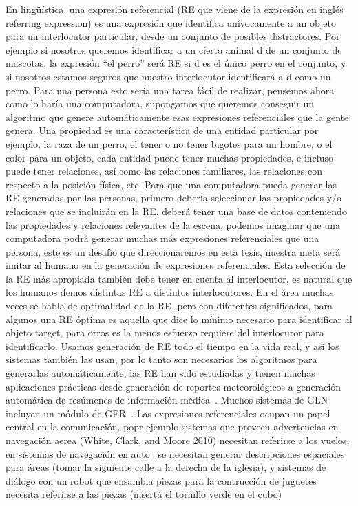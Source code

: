 En ling\"u\'{i}stica, una expresi\'on referencial (RE que viene de la expresi\'on en ingl\'es referring expression) es una expresi\'on que identifica un\'ivocamente a un objeto para un interlocutor particular, desde un conjunto de posibles distractores. Por ejemplo si nosotros queremos identificar a un cierto animal d de un conjunto de mascotas, la expresi\'on ``el perro'' ser\'a RE si d es el \'unico perro en el conjunto, y si nosotros estamos seguros que nuestro interlocutor identificar\'a a d como un perro. Para una persona esto ser\'ia una tarea f\'acil de realizar, pensemos ahora como lo har\'ia una computadora, supongamos que queremos conseguir un algoritmo que genere autom\'aticamente esas expresiones referenciales que la gente genera. Una propiedad es una caracter\'istica de una entidad particular por ejemplo, la raza de un perro, el tener o no tener bigotes para un hombre, o el color para un objeto, cada entidad puede tener muchas propiedades, e incluso puede tener relaciones, as\'i como las relaciones familiares, las relaciones con respecto a la posici\'on f\'isica, etc. Para que una computadora pueda generar las RE generadas por las personas, primero deber\'ia seleccionar las propiedades y/o relaciones que se incluir\'an en la RE, deber\'a tener una base de datos conteniendo las propiedades y relaciones relevantes de la escena, podemos imaginar que una computadora podr\'a generar muchas m\'as expresiones referenciales que una persona, este es un desaf\'io que direccionaremos en esta tesis, nuestra meta ser\'a imitar al humano en la generaci\'on de expresiones referenciales. Esta selecci\'on de la RE m\'as apropiada tambi\'en debe tener en cuenta al interlocutor, es natural que los humanos demos distintas RE a distintos interlocutores. En el \'area muchas veces se habla de optimalidad de la RE, pero con diferentes significados, para algunos una RE \'optima es aquella que dice lo m\'inimo necesario para identificar al objeto target, para otros es la menos esfuerzo requiere del interlocutor para identificarlo.
Usamos generaci\'on de RE todo el tiempo en la vida real, y as\'i los sistemas tambi\'en las usan, por lo tanto son necesarios los algoritmos para generarlas autom\'aticamente, las RE han sido estudiadas y tienen muchas aplicaciones pr\'acticas desde generaci\'on de reportes meteorol\'ogicos a generaci\'on autom\'atica de res\'umenes de informaci\'on m\'edica~\cite{dale2000}. Muchos sistemas de GLN incluyen un m\'odulo de GER~\cite{Mellish2004}.
Las expresiones referenciales ocupan un papel central en la comunicaci\'on, popr ejemplo sistemas que proveen advertencias en navegaci\'on aerea
 (White, Clark, and Moore 2010) necesitan referirse a los vuelos, en sistemas de navegaci\'on en auto~\cite{Drager:2012:GLN:2380816.2380908} se necesitan generar descripciones espaciales para \'areas (tomar la siguiente calle a la derecha de la iglesia), y sistemas de di\'alogo con un robot que ensambla piezas para la contrucci\'on de juguetes~\cite{foster-etal-ijcai2009} necesita referirse a las piezas (insert\'a el tornillo verde en el cubo)

